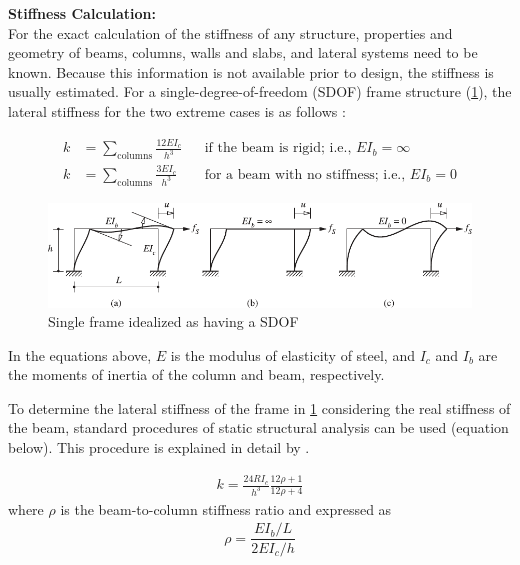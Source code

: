 \documentclass{simcenterdocumentation}
\newcommand{\kip}{\ensuremath{\,\mathrm{k}}}
\begin{document}

\vspace{10mm}
\noindent\textbf{Stiffness Calculation:}\\
\indent For the exact calculation of the stiffness of any structure, properties and geometry of beams, columns, walls and slabs, and lateral systems need to be known. Because this information is not available prior to design, the stiffness is usually estimated. For a single-degree-of-freedom (SDOF) frame structure (\cref{fig:frame_sdof}), the lateral stiffness for the two extreme cases is as follows \cite{ChopraAnilK2012Dos}:

\begin{align*}
k &= \sum_\mathrm{columns} \frac{12 E I_c}{h^3}	&& \text{if the beam is rigid; i.e., } EI_b = \infty		\\
k &= \sum_\mathrm{columns} \frac{3 E I_c}{h^3}	&& \text{for a beam with no stiffness; i.e., } EI_b = 0
\end{align*}
\begin{figure}[H]
	\centering \includegraphics[width=0.9\linewidth]{frame_sdof.pdf}
	\caption{Single frame idealized as having a SDOF \cite{ChopraAnilK2012Dos}}
	\label{fig:frame_sdof}
\end{figure}

In the equations above, $E$ is the modulus of elasticity of steel, and $I_c$ and $I_b$ are the moments of inertia of the column and beam, respectively.

To determine the lateral stiffness of the frame in \cref{fig:frame_sdof} considering the real stiffness of the beam, standard procedures of static structural analysis can be used (equation below). This procedure is explained in detail by \cite{ChopraAnilK2012Dos}.

\begin{gather*}
k = \frac{24 R I_c}{h^3} \frac{12 \rho + 1}{12 \rho + 4}
\end{gather*}
where $\rho$ is the beam-to-column stiffness ratio and expressed as 
\begin{gather*}
\rho = \dfrac{EI_b / L}{2 E I_c/h}
\end{gather*}
\end{document}
